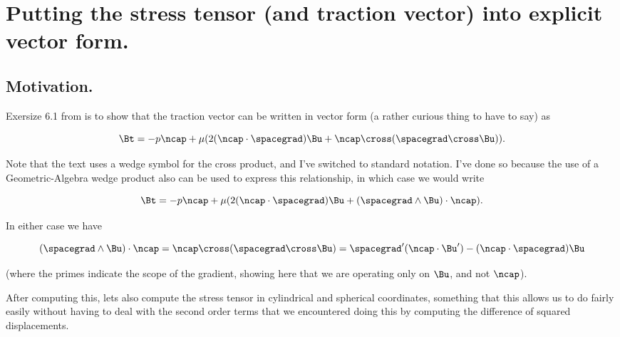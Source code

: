 
%

\chapter{Putting the stress tensor (and traction vector) into explicit vector form.}
\label{chap:continuumstressTensorVectorForm}
{}
\date{Apr 4, 2012}

\beginArtWithToc

\section{Motivation.}

Exersize 6.1 from \cite{acheson1990elementary} is to show that the traction vector can be written in vector form (a rather curious thing to have to say) as

\begin{equation}\label{eqn:stressTensorVectorForm:10}
\Bt = -p \ncap + \mu ( 2 (\ncap \cdot \spacegrad)\Bu + \ncap \cross (\spacegrad \cross \Bu)).
\end{equation}

Note that the text uses a wedge symbol for the cross product, and I've switched to standard notation.  I've done so because the use of a Geometric-Algebra wedge product also can be used to express this relationship, in which case we would write

\begin{equation}\label{eqn:stressTensorVectorForm:30}
\Bt = -p \ncap + \mu ( 2 (\ncap \cdot \spacegrad) \Bu + (\spacegrad \wedge \Bu) \cdot \ncap).
\end{equation}

In either case we have

\begin{equation}\label{eqn:stressTensorVectorForm:50}
(\spacegrad \wedge \Bu) \cdot \ncap
= 
\ncap \cross (\spacegrad \cross \Bu)
=
\spacegrad' (\ncap \cdot \Bu') - (\ncap \cdot \spacegrad) \Bu 
\end{equation}

(where the primes indicate the scope of the gradient, showing here that we are operating only on $\Bu$, and not $\ncap$).

After computing this, lets also compute the stress tensor in cylindrical and spherical coordinates, something that this allows us to do fairly easily without having to deal with the second order terms that we encountered doing this by computing the difference of squared displacements.

